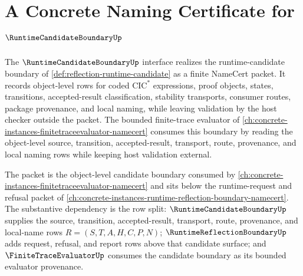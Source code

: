 \chapter{A Concrete Naming Certificate for $\RuntimeCandidateBoundaryUp$}
\label{ch:concrete-instances-runtimecandidateboundary-namecert}

The $\RuntimeCandidateBoundaryUp$ interface realizes the runtime-candidate boundary of \autoref{def:reflection-runtime-candidate} as a finite NameCert packet. It records object-level rows for coded $\mathrm{CIC}^{*}$ expressions, proof objects, states, transitions, accepted-result classification, stability transports, consumer routes, package provenance, and local naming, while leaving validation by the host checker outside the packet. The bounded finite-trace evaluator of \autoref{ch:concrete-instances-finitetraceevaluator-namecert} consumes this boundary by reading the object-level source, transition, accepted-result, transport, route, provenance, and local naming rows while keeping host validation external.

The packet is the object-level candidate boundary consumed by \autoref{ch:concrete-instances-finitetraceevaluator-namecert} and sits below the runtime-request and refusal packet of \autoref{ch:concrete-instances-runtime-reflection-boundary-namecert}. The substantive dependency is the row split: $\RuntimeCandidateBoundaryUp$ supplies the source, transition, accepted-result, transport, route, provenance, and local-name rows $R=(S,T,A,H,C,P,N)$; $\RuntimeReflectionBoundaryUp$ adds request, refusal, and report rows above that candidate surface; and $\FiniteTraceEvaluatorUp$ consumes the candidate boundary as its bounded evaluator provenance.


